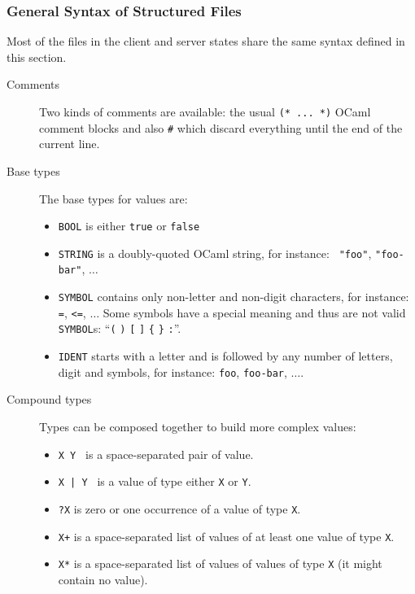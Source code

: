 \documentclass[a4paper,10pt]{article}
\begin{document}
\subsubsection{General Syntax of Structured Files}
\label{file:general}

Most of the files in the client and server states share the same
syntax defined in this section.

\begin{description}

\item[Comments] Two kinds of comments are available: the usual
  \verb+(* ... *)+ OCaml comment blocks and also \verb+#+ which
  discard everything until the end of the current line.

\item[Base types] The base types for values are:

\begin{itemize}
\item {\tt BOOL} is  either {\tt true} or {\tt false}
\item {\tt STRING} is a doubly-quoted OCaml string, for instance: {\tt
  "foo"}, {\tt "foo-bar"}, $\ldots$
\item {\tt SYMBOL} contains only non-letter and non-digit characters,
  for instance: {\tt =}, {\tt <=}, $\ldots$ Some symbols have a special
  meaning and thus are not valid {\tt SYMBOL}s: ``\verb+(+ \verb+)+
  \verb+[+ \verb+]+ \verb+{+ \verb+}+ \verb+:+''.
\item {\tt IDENT} starts with a letter and is followed by any number of
  letters, digit and symbols, for instance: {\tt foo}, {\tt foo-bar},
  $\ldots$.
\end{itemize}


\item[Compound types] Types can be composed together to build more
  complex values:

\begin{itemize}
\item {\tt X Y } is a space-separated pair of value.
\item {\tt X | Y } is a value of type either {\tt X} or {\tt Y}.
\item {\tt ?X} is zero or one occurrence of a value of type {\tt X}.
\item {\tt X+} is a space-separated list of values of at least one value
  of type {\tt X}.
\item {\tt X*} is a space-separated list of values of values of type
  {\tt X} (it might contain no value).
\end{itemize}

\end{description}
\end{document}
